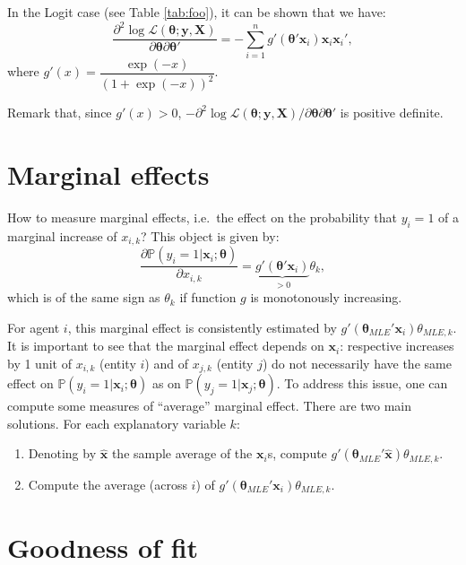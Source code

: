 \documentclass[
  12pt,
]{book}
\providecommand{\tightlist}{%
  \setlength{\itemsep}{0pt}\setlength{\parskip}{0pt}}
\theoremstyle{definition}
\theoremstyle{definition}
\theoremstyle{definition}
\theoremstyle{definition}
\theoremstyle{remark}
\begin{document}
In the Logit case (see Table \ref{tab:foo}), it can be shown that we have:
\[
\frac{\partial^2 \log \mathcal{L}(\boldsymbol\theta;\mathbf{y},\mathbf{X})}{\partial \boldsymbol\theta \partial \boldsymbol\theta'} = - \sum_{i=1}^{n} g'(\boldsymbol\theta'\mathbf{x}_i) \mathbf{x}_i\mathbf{x}_i',
\]
where \(g'(x)=\dfrac{\exp(-x)}{(1 + \exp(-x))^2}\).

Remark that, since \(g'(x)>0\), \(-\partial^2 \log \mathcal{L}(\boldsymbol\theta;\mathbf{y},\mathbf{X})/\partial \boldsymbol\theta \partial \boldsymbol\theta'\) is positive definite.

\hypertarget{marginalFX}{%
\section{Marginal effects}\label{marginalFX}}

How to measure marginal effects, i.e.~the effect on the probability that \(y_i=1\) of a marginal increase of \(x_{i,k}\)? This object is given by:
\[
\frac{\partial \mathbb{P}(y_i=1|\mathbf{x}_i;\boldsymbol\theta)}{\partial x_{i,k}} = \underbrace{g'(\boldsymbol\theta'\mathbf{x}_i)}_{>0}\theta_k,
\]
which is of the same sign as \(\theta_k\) if function \(g\) is monotonously increasing.

For agent \(i\), this marginal effect is consistently estimated by \(g'(\boldsymbol\theta_{MLE}'\mathbf{x}_i)\theta_{MLE,k}\). It is important to see that the marginal effect depends on \(\mathbf{x}_i\): respective increases by 1 unit of \(x_{i,k}\) (entity \(i\)) and of \(x_{j,k}\) (entity \(j\)) do not necessarily have the same effect on \(\mathbb{P}(y_i=1|\mathbf{x}_i;\boldsymbol\theta)\) as on \(\mathbb{P}(y_j=1|\mathbf{x}_j;\boldsymbol\theta)\). To address this issue, one can compute some measures of ``average'' marginal effect. There are two main solutions. For each explanatory variable \(k\):

\begin{enumerate}
\def\labelenumi{\roman{enumi}.}
\tightlist
\item
  Denoting by \(\hat{\mathbf{x}}\) the sample average of the \(\mathbf{x}_i\)s, compute \(g'(\boldsymbol\theta_{MLE}'\hat{\mathbf{x}})\theta_{MLE,k}\).
\item
  Compute the average (across \(i\)) of \(g'(\boldsymbol\theta_{MLE}'\mathbf{x}_i)\theta_{MLE,k}\).
\end{enumerate}

\hypertarget{goodness-of-fit-1}{%
\section{Goodness of fit}\label{goodness-of-fit-1}}
\end{document}
